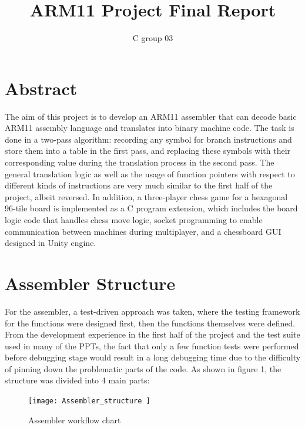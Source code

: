 \documentclass[11pt]{article}
\begin{document}
\title{ARM11 Project Final Report}
\author{C group 03}

\maketitle

\section{Abstract}
The aim of this project is to develop an ARM11 assembler that can decode basic ARM11 assembly language and translates into binary machine code. The task is done in a two-pass algorithm: recording any symbol for branch instructions and store them into a table in the first pass, and replacing these symbols with their corresponding value during the translation process in the second pass. The general translation logic as well as the usage of function pointers with respect to different kinds of instructions are very much similar to the first half of the project, albeit reversed. In addition, a three-player chess game for a hexagonal 96-tile board is implemented as a C program extension, which includes the board logic code that handles chess move logic, socket programming to enable communication between machines during multiplayer, and a chessboard GUI designed in Unity engine.
\section{Assembler Structure}
For the assembler, a test-driven approach was taken, where the testing framework for the functions were designed first, then the functions themselves were defined. From the development experience in the first half of the project and the test suite used in many of the PPTs, the fact that only a few function tests were performed before debugging stage would result in a long debugging time due to the difficulty of pinning down the problematic parts of the code.\newline\newline\newline\newline
As shown in figure 1, the structure was divided into 4 main parts: 

\begin{figure}
\centering
\begin{minipage}{.5\textwidth}
\centering
\texttt{[image:  Assembler\_structure ]}
\caption{Assembler workflow chart}
\label{fig:assembly}
\end{minipage}\hfill
\end{figure}
\end{document}
